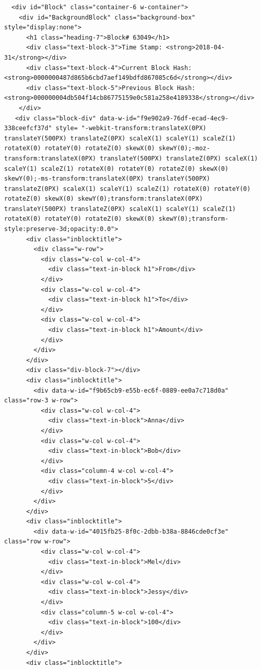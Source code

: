 \begin{lstlisting}
  <div id="Block" class="container-6 w-container">
    <div id="BackgroundBlock" class="background-box" style="display:none">
      <h1 class="heading-7">Block# 63049</h1>
      <div class="text-block-3">Time Stamp: <strong>2018-04-31</strong></div>
      <div class="text-block-4">Current Block Hash: <strong>0000000487d865b6cbd7aef149bdfd867085c6d</strong></div>
      <div class="text-block-5">Previous Block Hash: <strong>000000004db504f14cb86775159e0c581a258e4189338</strong></div>
    </div>
   <div class="block-div" data-w-id="f9e902a9-76df-ecad-4ec9-338ceefcf37d" style= "-webkit-transform:translateX(0PX) translateY(500PX) translateZ(0PX) scaleX(1) scaleY(1) scaleZ(1) rotateX(0) rotateY(0) rotateZ(0) skewX(0) skewY(0);-moz-transform:translateX(0PX) translateY(500PX) translateZ(0PX) scaleX(1) scaleY(1) scaleZ(1) rotateX(0) rotateY(0) rotateZ(0) skewX(0) skewY(0);-ms-transform:translateX(0PX) translateY(500PX) translateZ(0PX) scaleX(1) scaleY(1) scaleZ(1) rotateX(0) rotateY(0) rotateZ(0) skewX(0) skewY(0);transform:translateX(0PX) translateY(500PX) translateZ(0PX) scaleX(1) scaleY(1) scaleZ(1) rotateX(0) rotateY(0) rotateZ(0) skewX(0) skewY(0);transform-style:preserve-3d;opacity:0.0">
      <div class="inblocktitle">
        <div class="w-row">
          <div class="w-col w-col-4">
            <div class="text-in-block h1">From</div>
          </div>
          <div class="w-col w-col-4">
            <div class="text-in-block h1">To</div>
          </div>
          <div class="w-col w-col-4">
            <div class="text-in-block h1">Amount</div>
          </div>
        </div>
      </div>
      <div class="div-block-7"></div>
      <div class="inblocktitle">
        <div data-w-id="f9b65cb9-e55b-ec6f-0889-ee0a7c718d0a" class="row-3 w-row">
          <div class="w-col w-col-4">
            <div class="text-in-block">Anna</div>
          </div>
          <div class="w-col w-col-4">
            <div class="text-in-block">Bob</div>
          </div>
          <div class="column-4 w-col w-col-4">
            <div class="text-in-block">5</div>
          </div>
        </div>
      </div>
      <div class="inblocktitle">
        <div data-w-id="4015fb25-8f0c-2dbb-b38a-8846cde0cf3e" class="row w-row">
          <div class="w-col w-col-4">
            <div class="text-in-block">Mel</div>
          </div>
          <div class="w-col w-col-4">
            <div class="text-in-block">Jessy</div>
          </div>
          <div class="column-5 w-col w-col-4">
            <div class="text-in-block">100</div>
          </div>
        </div>
      </div>
      <div class="inblocktitle">

\end{lstlisting}
